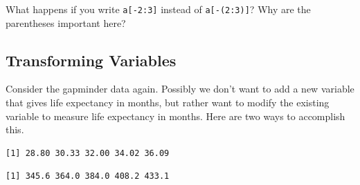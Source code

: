 \documentclass[
]{krantz}
\makeatletter
\newenvironment{Shaded}{\begin{snugshade}}{\end{snugshade}}
\newcommand{\DecValTok}[1]{\textcolor[rgb]{0.06,0.06,0.06}{#1}}
\newcommand{\KeywordTok}[1]{\textcolor[rgb]{0.27,0.27,0.27}{\textbf{#1}}}
\newcommand{\NormalTok}[1]{#1}
\newcommand{\OperatorTok}[1]{\textcolor[rgb]{0.43,0.43,0.43}{\textbf{#1}}}
\newcommand{\StringTok}[1]{\textcolor[rgb]{0.5,0.5,0.5}{#1}}
\newenvironment{kframe}{%
\medskip{}
\setlength{\fboxsep}{.8em}
 \def\at@end@of@kframe{}%
 \ifinner\ifhmode%
  \def\at@end@of@kframe{\end{minipage}}%
  \begin{minipage}{\columnwidth}%
 \fi\fi%
 \def\FrameCommand##1{\hskip\@totalleftmargin \hskip-\fboxsep
 \colorbox{shadecolor}{##1}\hskip-\fboxsep
     \hskip-\linewidth \hskip-\@totalleftmargin \hskip\columnwidth}%
 \MakeFramed {\advance\hsize-\width
   \@totalleftmargin\z@ \linewidth\hsize
   \@setminipage}}%
 {\par\unskip\endMakeFramed%
 \at@end@of@kframe}
\renewenvironment{Shaded}{\begin{kframe}}{\end{kframe}}
\makeatother
\begin{document}
What happens if you write \texttt{a{[}-2:3{]}} instead of \texttt{a{[}-(2:3){]}}? Why are the parentheses important here?

\hypertarget{transforming-variables}{%
\subsection{Transforming Variables}\label{transforming-variables}}

Consider the gapminder data again. Possibly we don't want to add a new variable that gives life expectancy in months, but rather want to modify the existing variable to measure life expectancy in months. Here are two ways to accomplish this.

\begin{Shaded}
\end{Shaded}

\begin{verbatim}
[1] 28.80 30.33 32.00 34.02 36.09
\end{verbatim}

\begin{Shaded}
\end{Shaded}

\begin{verbatim}
[1] 345.6 364.0 384.0 408.2 433.1
\end{verbatim}

\begin{Shaded}
\end{Shaded}
\end{document}

